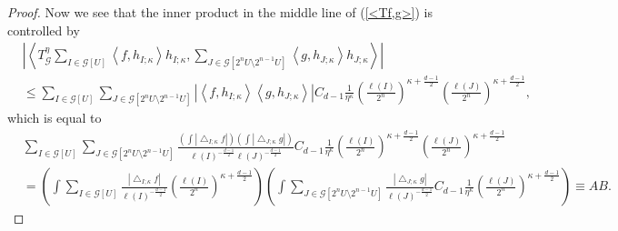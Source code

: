 \documentclass{amsart}%
\theoremstyle{plain}
\numberwithin{equation}{section}
\begin{document}
\begin{proof}
Now we see that the inner product in the middle line of (\ref{<Tf,g>}) is
controlled by%
\begin{align*}
& \left\vert \left\langle T_{\mathcal{G}}^{\eta}\sum_{I\in\mathcal{G}\left[
U\right]  }\left\langle f,h_{I;\kappa}\right\rangle h_{I;\kappa},\sum
_{J\in\mathcal{G}\left[  2^{n}U\setminus2^{n-1}U\right]  }\left\langle
g,h_{J;\kappa}\right\rangle h_{J;\kappa}\right\rangle \right\vert \\
& \leq\sum_{I\in\mathcal{G}\left[  U\right]  }\sum_{J\in\mathcal{G}\left[
2^{n}U\setminus2^{n-1}U\right]  }\left\vert \left\langle f,h_{I;\kappa
}\right\rangle \left\langle g,h_{J;\kappa}\right\rangle \right\vert
C_{d-1}\frac{1}{\eta^{\kappa}}\left(  \frac{\ell\left(  I\right)  }{2^{n}%
}\right)  ^{\kappa+\frac{d-1}{2}}\left(  \frac{\ell\left(  J\right)  }{2^{n}%
}\right)  ^{\kappa+\frac{d-1}{2}},
\end{align*}
which is equal to%
\begin{align*}
& \sum_{I\in\mathcal{G}\left[  U\right]  }\sum_{J\in\mathcal{G}\left[
2^{n}U\setminus2^{n-1}U\right]  }\frac{\left(  \int\left\vert \bigtriangleup
_{I;\kappa}f\right\vert \right)  \left(  \int\left\vert \bigtriangleup
_{J;\kappa}g\right\vert \right)  }{\ell\left(  I\right)  ^{-\frac{d-1}{2}}%
\ell\left(  J\right)  ^{-\frac{d-1}{2}}}C_{d-1}\frac{1}{\eta^{\kappa}}\left(
\frac{\ell\left(  I\right)  }{2^{n}}\right)  ^{\kappa+\frac{d-1}{2}}\left(
\frac{\ell\left(  J\right)  }{2^{n}}\right)  ^{\kappa+\frac{d-1}{2}}\\
& =\left(  \int\sum_{I\in\mathcal{G}\left[  U\right]  }\frac{\left\vert
\bigtriangleup_{I;\kappa}f\right\vert }{\ell\left(  I\right)  ^{-\frac{d-1}%
{2}}}\left(  \frac{\ell\left(  I\right)  }{2^{n}}\right)  ^{\kappa+\frac
{d-1}{2}}\right)  \left(  \int\sum_{J\in\mathcal{G}\left[  2^{n}%
U\setminus2^{n-1}U\right]  }\frac{\left\vert \bigtriangleup_{J;\kappa
}g\right\vert }{\ell\left(  J\right)  ^{-\frac{d-1}{2}}}C_{d-1}\frac{1}%
{\eta^{\kappa}}\left(  \frac{\ell\left(  J\right)  }{2^{n}}\right)
^{\kappa+\frac{d-1}{2}}\right)  \equiv AB.
\end{align*}



\end{proof}
\end{document}

